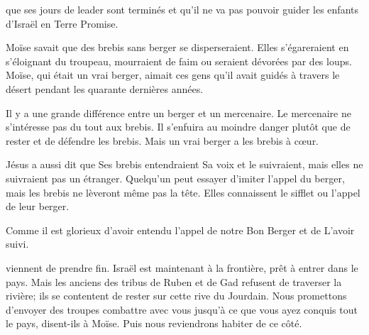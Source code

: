  que ses jours de leader
 sont terminés et qu'il ne va pas pouvoir guider les enfants d'Israël
 en Terre Promise.

Moïse savait que des brebis sans berger se disperseraient.
 Elles s'égareraient en s'éloignant du troupeau,
 mourraient de faim ou seraient dévorées par des loups.
 Moïse, qui était un vrai berger,
 aimait ces gens qu'il avait guidés à travers le désert
 pendant les quarante dernières années.

Il y a une grande différence entre un berger et un mercenaire.
 Le mercenaire ne s'intéresse pas du tout aux brebis.
 Il s'enfuira au moindre danger plutôt que de rester et de défendre les brebis.
 Mais un vrai berger a les brebis à cœur.


Jésus a aussi dit que Ses brebis entendraient Sa voix et le suivraient,
 mais elles ne suivraient pas un étranger.
 Quelqu'un peut essayer d'imiter l'appel du berger,
 mais les brebis ne lèveront même pas la tête.
 Elles connaissent le sifflet ou l'appel de leur berger.

Comme il est glorieux d'avoir entendu l'appel de notre Bon Berger
 et de L'avoir suivi. 

\dvrule






 viennent de prendre fin.
 Israël est maintenant à la frontière, prêt à entrer dans le pays.
 Mais les anciens des tribus de Ruben et de Gad
 refusent de traverser la rivière;
 ils se contentent de rester sur cette rive du Jourdain.
 \og Nous promettons d'envoyer des troupes combattre avec vous
 jusqu'à ce que vous ayez conquis tout le pays,
 disent-ils à Moïse. Puis nous reviendrons habiter de ce côté. \fg{}

